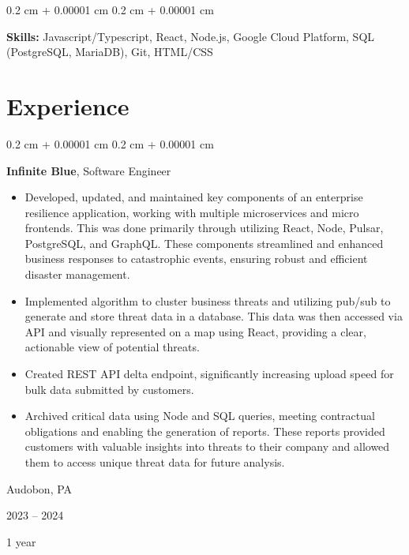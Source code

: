 \documentclass[10pt, letterpaper]{article}
\newenvironment{highlights}{
    \begin{itemize}[
        topsep=0.10 cm,
        parsep=0.10 cm,
        partopsep=0pt,
        itemsep=0pt,
        leftmargin=0.4 cm + 10pt
    ]
}{
    \end{itemize}
} %
\newenvironment{onecolentry}{
    \begin{adjustwidth}{
        0.2 cm + 0.00001 cm
    }{
        0.2 cm + 0.00001 cm
    }
}{
    \end{adjustwidth}
} %
\newenvironment{twocolentry}[2][]{
    \onecolentry
    \def\secondColumn{#2}
    \setcolumnwidth{\fill, 4.5 cm}
    \begin{paracol}{2}
}{
    \switchcolumn \raggedleft \secondColumn
    \end{paracol}
    \endonecolentry
} %
\begin{document}
        
        \begin{onecolentry}
            \textbf{Skills:} Javascript/Typescript, React, Node.js, Google Cloud Platform, SQL (PostgreSQL, MariaDB), Git, HTML/CSS
        \end{onecolentry}


    
    \section{Experience}



        
        \begin{twocolentry}{
            Audobon, PA

        2023 – 2024

        1 year
        }
            \textbf{Infinite Blue}, Software Engineer
            \begin{highlights}
                \item Developed, updated, and maintained key components of an enterprise resilience application, working with multiple microservices and micro frontends. This was done primarily through utilizing React, Node, Pulsar, PostgreSQL, and GraphQL. These components streamlined and enhanced business responses to catastrophic events, ensuring robust and efficient disaster management.
                \item Implemented algorithm to cluster business threats and utilizing pub/sub to generate and store threat data in a database. This data was then accessed via API and visually represented on a map using React, providing a clear, actionable view of potential threats.
                \item Created REST API delta endpoint, significantly increasing upload speed for bulk data submitted by customers.
                \item Archived critical data using Node and SQL queries, meeting contractual obligations and enabling the generation of reports. These reports provided customers with valuable insights into threats to their company and allowed them to access unique threat data for future analysis.
            \end{highlights}
        \end{twocolentry}


        \vspace{0.2 cm}
\end{document}
